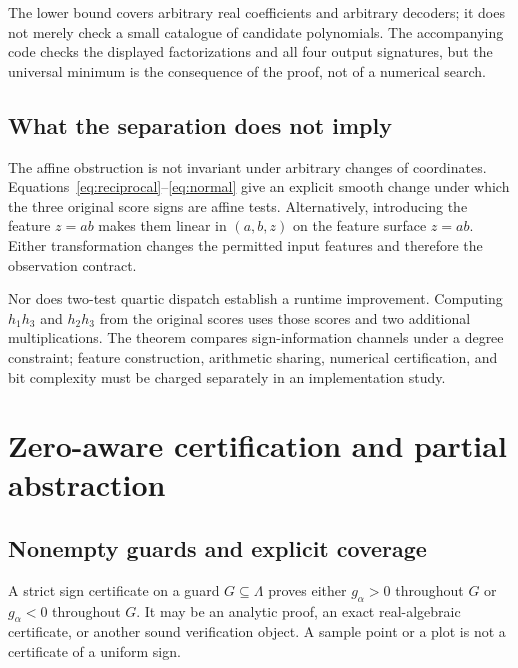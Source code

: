 \documentclass[11pt]{article}
\theoremstyle{definition}
\theoremstyle{remark}
\begin{document}
The lower bound covers arbitrary real coefficients and arbitrary decoders; it does not merely check a small catalogue of candidate polynomials. The accompanying code checks the displayed factorizations and all four output signatures, but the universal minimum is the consequence of the proof, not of a numerical search.

\subsection{What the separation does not imply}
The affine obstruction is not invariant under arbitrary changes of coordinates. Equations~\eqref{eq:reciprocal}--\eqref{eq:normal} give an explicit smooth change under which the three original score signs are affine tests. Alternatively, introducing the feature $z=ab$ makes them linear in $(a,b,z)$ on the feature surface $z=ab$. Either transformation changes the permitted input features and therefore the observation contract.

Nor does two-test quartic dispatch establish a runtime improvement. Computing $h_1h_3$ and $h_2h_3$ from the original scores uses those scores and two additional multiplications. The theorem compares sign-information channels under a degree constraint; feature construction, arithmetic sharing, numerical certification, and bit complexity must be charged separately in an implementation study.

\section{Zero-aware certification and partial abstraction}\label{sec:cert}

\subsection{Nonempty guards and explicit coverage}
A strict sign certificate on a guard $G\subseteq\Lambda$ proves either $g_\alpha>0$ throughout $G$ or $g_\alpha<0$ throughout $G$. It may be an analytic proof, an exact real-algebraic certificate, or another sound verification object. A sample point or a plot is not a certificate of a uniform sign.
\end{document}
